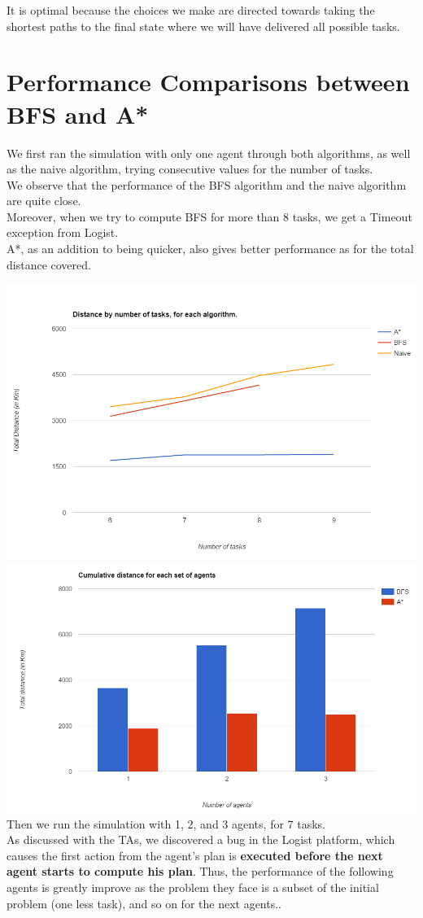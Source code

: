 \documentclass[fontsize=12pt]{scrartcl} %
\begin{document}
It is optimal because the choices we make are directed towards taking the shortest paths to the final state where we will have delivered all possible tasks.



\section*{Performance Comparisons between BFS and A*}

We first ran the simulation with only one agent through both algorithms, as well as the naive algorithm, trying consecutive values for the number of tasks. \\
We observe that the performance of the BFS algorithm and the naive algorithm are quite close. \\ Moreover, when we try to compute BFS for more than 8 tasks, we get a Timeout exception from Logist. \\
A*, as an addition to being quicker, also gives better performance as for the total distance covered. 

\includegraphics[width=.5\linewidth]{distance-nbtask.png}
\includegraphics[width=.5\linewidth]{cumdist-nbagents.png} \\


Then we run the simulation with 1, 2, and 3 agents, for 7 tasks. \\
As discussed with the TAs, we discovered a bug in the Logist platform, which causes the first action from the agent's plan is \textbf{executed before the next agent starts to compute his plan}. Thus, the performance of the following agents is greatly improve as the problem they face is a subset of the initial problem (one less task), and so on for the next agents.. \\
\end{document}
